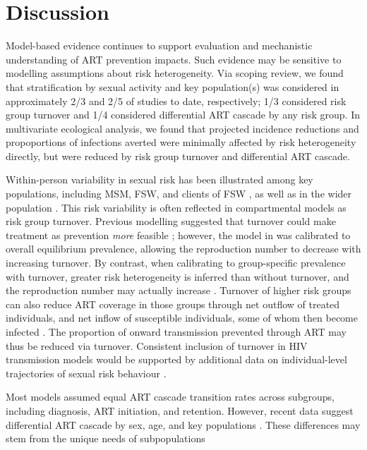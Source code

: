 \section{Discussion}
\label{s:disc}
Model-based evidence continues to support
evaluation and mechanistic understanding of ART prevention impacts.
Such evidence may be sensitive to modelling assumptions about risk heterogeneity.
Via scoping review, we found that stratification by sexual activity and key population(s)
was considered in approximately 2/3 and 2/5 of studies to date, respectively;
1/3 considered risk group turnover and 1/4 considered differential ART cascade by any risk group.
In multivariate ecological analysis, we found that
projected incidence reductions and propoportions of infections averted
were minimally affected by risk heterogeneity directly,
but were reduced by risk group turnover and differential ART cascade.
\par
Within-person variability in sexual risk has been illustrated among key populations,
including MSM, FSW, and clients of FSW \cite{Fazito2012,Romero-Severson2012,Roberts2020},
as well as in the wider population \cite{Houle2018}.
This risk variability is often reflected in compartmental models as risk group turnover.
Previous modelling suggested that
turnover could make treatment as prevention \emph{more} feasible \cite{Henry2015};
however, the model in \cite{Henry2015} was calibrated to overall equilibrium prevalence,
allowing the reproduction number to decrease with increasing turnover.
By contrast, when calibrating to group-specific prevalence with turnover,
greater risk heterogeneity is inferred than without turnover,
and the reproduction number may actually increase \cite{Knight2020}.
Turnover of higher risk groups can also reduce ART coverage in those groups through
net outflow of treated individuals, and net inflow of susceptible individuals,
some of whom then become infected \cite{Knight2020}.
The proportion of onward transmission prevented through ART may thus be reduced via turnover.
Consistent inclusion of turnover in HIV transmission models would be supported by
additional data on individual-level trajectories of sexual risk behaviour \cite{Watts2010}.
\par
Most models assumed equal ART cascade transition rates across subgroups,
including diagnosis, ART initiation, and retention.
However, recent data suggest differential ART cascade by sex, age, and key populations
\cite{Lancaster2016,Schwartz2017,Ma2020,Green2020}.
These differences may stem from the unique needs of subpopulations
